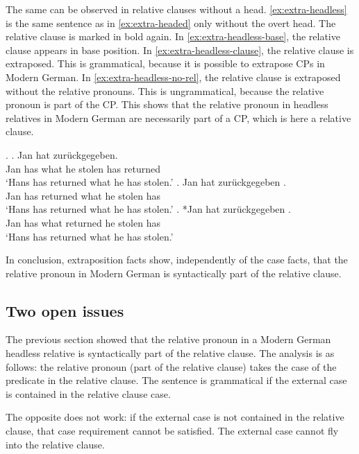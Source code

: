 The same can be observed in relative clauses without a head. \ref{ex:extra-headless} is the same sentence as in \ref{ex:extra-headed} only without the overt head. The relative clause is marked in bold again.
In \ref{ex:extra-headless-base}, the relative clause appears in base position. In \ref{ex:extra-headless-clause}, the relative clause is extraposed. This is grammatical, because it is possible to extrapose CPs in Modern German. In \ref{ex:extra-headless-no-rel}, the relative clause is extraposed without the relative pronouns. This is ungrammatical, because the relative pronoun is part of the CP.
This shows that the relative pronoun in headless relatives in Modern German are necessarily part of a CP, which is here a relative clause.

\ex.\label{ex:extra-headless}
\ag. Jan hat     zurückgegeben.\\
Jan has what he stolen has returned\\
`Hans has returned what he has stolen.' \citet[185]{groos1981}\label{ex:extra-headless-base}
\bg. Jan hat zurückgegeben    .\\
Jan has returned what he stolen has\\
`Hans has returned what he has stolen.' \citet[185]{groos1981}\label{ex:extra-headless-clause}
\bg. *Jan hat  zurückgegeben   .\\
Jan has what returned he stolen has\\
`Hans has returned what he has stolen.' \citet[185]{groos1981}\label{ex:extra-headless-no-rel}

In conclusion, extraposition facts show, independently of the case facts, that the relative pronoun in Modern German is syntactically part of the relative clause.


\subsection{Two open issues}

The previous section showed that the relative pronoun in a Modern German headless relative is syntactically part of the relative clause. The analysis is as follows: the relative pronoun (part of the relative clause) takes the case of the predicate in the relative clause. The sentence is grammatical if the external case is contained in the relative clause case.

The opposite does not work: if the external case is not contained in the relative clause, that case requirement cannot be satisfied. The external case cannot fly into the relative clause.


